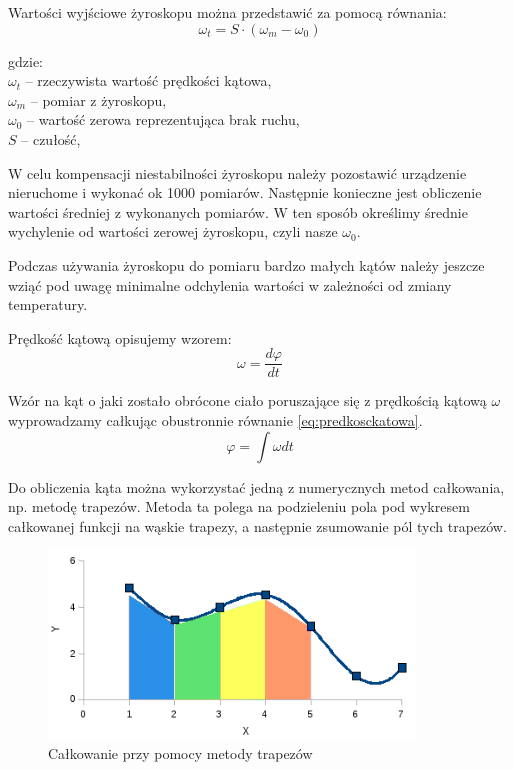 Wartości wyjściowe żyroskopu można przedstawić za pomocą równania:
\begin{equation}
  \omega_{t} = S \cdot \left(\omega_{m} - \omega_{0}\right) 
\end{equation}
\begin{tabbing}
  gdzie: \= \\
    \> $\omega_{t}$ -- rzeczywista wartość prędkości kątowa, \\
    \> $\omega_{m}$ -- pomiar z żyroskopu,\\
    \> $\omega_{0}$ -- wartość zerowa reprezentująca brak ruchu,\\
    \> $S$ -- czułość,\\
\end{tabbing}

W celu kompensacji niestabilności żyroskopu należy pozostawić urządzenie nieruchome i wykonać ok 1000 pomiarów. Następnie
konieczne jest obliczenie wartości średniej z wykonanych pomiarów. W ten sposób określimy średnie wychylenie od wartości
zerowej żyroskopu, czyli nasze $\omega_{0}$.

Podczas używania żyroskopu do pomiaru bardzo małych kątów należy jeszcze wziąć pod uwagę minimalne odchylenia wartości w
zależności od zmiany temperatury.

Prędkość kątową opisujemy wzorem: 
\begin{equation}
  \label{eq:predkosckatowa}
  \omega = \frac{d\varphi}{dt}
\end{equation}

Wzór na kąt o jaki zostało obrócone ciało poruszające się z prędkością kątową $\omega$ wyprowadzamy całkując obustronnie równanie \ref{eq:predkosckatowa}.
\begin{equation}
  \varphi = \int \omega dt
\end{equation}

Do obliczenia kąta można wykorzystać jedną z numerycznych metod całkowania, np. metodę trapezów. Metoda ta polega na podzieleniu pola pod wykresem całkowanej funkcji na wąskie trapezy, a następnie zsumowanie pól tych trapezów.

\begin{figure}[h!]
 \centering
 \includegraphics[height=50mm]{../images/ch04/calkowanie-metoda-trapezow.png}
 \caption{Całkowanie przy pomocy metody trapezów}
 \label{fig:CalkowanieTrapezy}
\end{figure}


